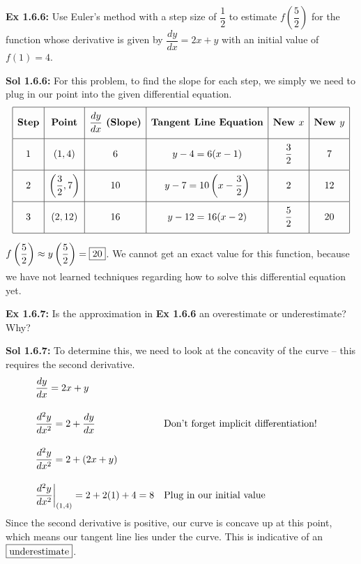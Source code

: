 \begin{tcolorbox}[example]
    \textbf{Ex 1.6.6: } Use Euler's method with a step size of $\dfrac{1}{2}$ to estimate $f\left(\dfrac{5}{2}\right)$ for the function whose derivative is given by $\dfrac{dy}{dx} = 2x + y$ with an initial value of $f(1) = 4$.
\end{tcolorbox}
\begin{tcolorbox}[solution]
    \textbf{Sol 1.6.6: } For this problem, to find the slope for each step, we simply we need to plug in our point into the given differential equation. \begin{align*}
        \def\arraystretch{2.2} 
        \begin{array}{|c|c|c|c|c|c|}
            \hline
            \textbf{Step} & \textbf{Point} & \dfrac{dy}{dx} \textbf{ (Slope)} & \textbf{Tangent Line Equation} & \textbf{New } x & \textbf{New } y \\[5.5pt] \hline
            1 & (1, 4) & 6 & y - 4 = 6(x - 1) & \dfrac{3}{2} & 7 \\[5.5pt] \hline
            2 & \left(\dfrac{3}{2}, 7\right) & 10 & y - 7 = 10\left(x - \dfrac{3}{2}\right) & 2 & 12 \\[5.5pt] \hline
            3 & (2, 12) & 16 & y - 12 = 16(x - 2) & \dfrac{5}{2} & 20 \\[5.5pt]
            \hline
        \end{array}
    \end{align*}
    $f\left(\dfrac{5}{2}\right) \approx y\left(\dfrac{5}{2}\right) = \boxed{20} \forcespace$. We cannot get an exact value for this function, because we have not learned techniques regarding how to solve this differential equation yet.
\end{tcolorbox} \vspace{11pt}

\begin{tcolorbox}[example]
    \textbf{Ex 1.6.7: } Is the approximation in \textbf{Ex 1.6.6} an overestimate or underestimate? Why?
\end{tcolorbox}
\begin{tcolorbox}[solution]
    \textbf{Sol 1.6.7: } To determine this, we need to look at the concavity of the curve -- this requires the second derivative. \begin{align*}
        & \dfrac{dy}{dx} = 2x + y \\[11pt]
        & \dfrac{d^2y}{dx^2} = 2 + \dfrac{dy}{dx} && \text{Don't forget implicit differentiation!} \\[11pt]
        & \dfrac{d^2y}{dx^2} = 2 + (2x + y) \\[11pt]
        & \dfrac{d^2y}{dx^2} \bigg|_{(1, 4)} = 2 + 2(1) + 4 = 8 && \text{Plug in our initial value}
    \end{align*}
    Since the second derivative is positive, our curve is concave up at this point, which means our tangent line lies under the curve. This is indicative of an $\boxed{\text{underestimate}} \smallforcespace$.
\end{tcolorbox}


